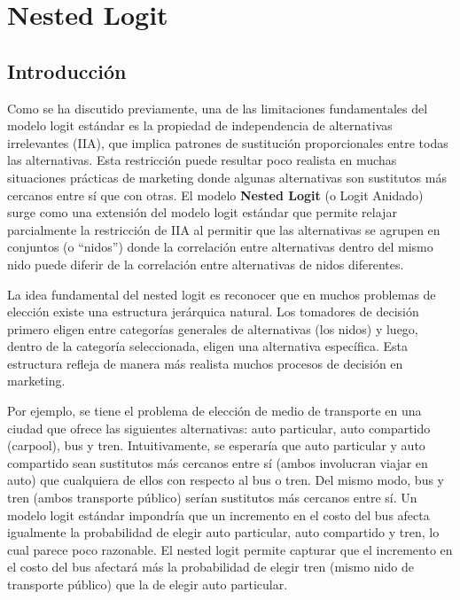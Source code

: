 \documentclass[
]{book}
\begin{document}
\hypertarget{nested-logit}{%
\section{Nested Logit}\label{nested-logit}}

\hypertarget{introducciuxf3n-1}{%
\subsection{Introducción}\label{introducciuxf3n-1}}

Como se ha discutido previamente, una de las limitaciones fundamentales del modelo logit estándar es la propiedad de independencia de alternativas irrelevantes (IIA), que implica patrones de sustitución proporcionales entre todas las alternativas. Esta restricción puede resultar poco realista en muchas situaciones prácticas de marketing donde algunas alternativas son sustitutos más cercanos entre sí que con otras. El modelo \textbf{Nested Logit} (o Logit Anidado) surge como una extensión del modelo logit estándar que permite relajar parcialmente la restricción de IIA al permitir que las alternativas se agrupen en conjuntos (o ``nidos'') donde la correlación entre alternativas dentro del mismo nido puede diferir de la correlación entre alternativas de nidos diferentes.

La idea fundamental del nested logit es reconocer que en muchos problemas de elección existe una estructura jerárquica natural. Los tomadores de decisión primero eligen entre categorías generales de alternativas (los nidos) y luego, dentro de la categoría seleccionada, eligen una alternativa específica. Esta estructura refleja de manera más realista muchos procesos de decisión en marketing.

Por ejemplo, se tiene el problema de elección de medio de transporte en una ciudad que ofrece las siguientes alternativas: auto particular, auto compartido (carpool), bus y tren. Intuitivamente, se esperaría que auto particular y auto compartido sean sustitutos más cercanos entre sí (ambos involucran viajar en auto) que cualquiera de ellos con respecto al bus o tren. Del mismo modo, bus y tren (ambos transporte público) serían sustitutos más cercanos entre sí. Un modelo logit estándar impondría que un incremento en el costo del bus afecta igualmente la probabilidad de elegir auto particular, auto compartido y tren, lo cual parece poco razonable. El nested logit permite capturar que el incremento en el costo del bus afectará más la probabilidad de elegir tren (mismo nido de transporte público) que la de elegir auto particular.
\end{document}
